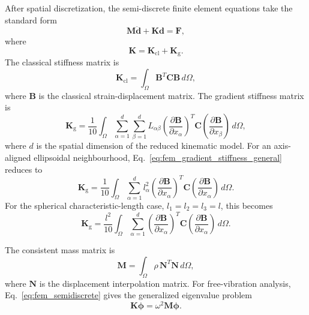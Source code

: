 \documentclass[final,3p,times,fleqn]{elsarticle}
\begin{document}
After spatial discretization, the semi-discrete finite element equations
take the standard form
\begin{equation}
\label{eq:fem_semidiscrete}
\mathbf{M}\ddot{\mathbf{d}}
+
\mathbf{K}\mathbf{d}
=
\mathbf{F},
\end{equation}
where
\begin{equation}
\label{eq:fem_total_stiffness}
\mathbf{K}
=
\mathbf{K}_{\mathrm{cl}}
+
\mathbf{K}_{\mathrm{g}} .
\end{equation}
The classical stiffness matrix is
\begin{equation}
\label{eq:fem_classical_stiffness}
\mathbf{K}_{\mathrm{cl}}
=
\int_{\Omega}\mathbf{B}^{T}\mathbf{C}\mathbf{B}\,d\Omega,
\end{equation}
where $\mathbf{B}$ is the classical strain-displacement matrix. The
gradient stiffness matrix is
\begin{equation}
\label{eq:fem_gradient_stiffness_general}
\mathbf{K}_{\mathrm{g}}
=
\frac{1}{10}
\int_{\Omega}
\sum_{\alpha=1}^{d}
\sum_{\beta=1}^{d}
L_{\alpha\beta}
\left(\frac{\partial\mathbf{B}}{\partial x_{\alpha}}\right)^{T}
\mathbf{C}
\left(\frac{\partial\mathbf{B}}{\partial x_{\beta}}\right)
\,d\Omega ,
\end{equation}
where $d$ is the spatial dimension of the reduced kinematic model.
For an axis-aligned ellipsoidal neighbourhood,
Eq.~\eqref{eq:fem_gradient_stiffness_general} reduces to
\begin{equation}
\label{eq:fem_gradient_stiffness_aligned}
\mathbf{K}_{\mathrm{g}}
=
\frac{1}{10}
\int_{\Omega}
\sum_{\alpha=1}^{d}
l_{\alpha}^{2}
\left(\frac{\partial\mathbf{B}}{\partial x_{\alpha}}\right)^{T}
\mathbf{C}
\left(\frac{\partial\mathbf{B}}{\partial x_{\alpha}}\right)
\,d\Omega .
\end{equation}
For the spherical characteristic-length case, $l_1=l_2=l_3=l$, this becomes
\begin{equation}
\label{eq:fem_gradient_stiffness_spherical}
\mathbf{K}_{\mathrm{g}}
=
\frac{l^2}{10}
\int_{\Omega}
\sum_{\alpha=1}^{d}
\left(\frac{\partial\mathbf{B}}{\partial x_{\alpha}}\right)^{T}
\mathbf{C}
\left(\frac{\partial\mathbf{B}}{\partial x_{\alpha}}\right)
\,d\Omega .
\end{equation}

The consistent mass matrix is
\begin{equation}
\label{eq:fem_mass_general}
\mathbf{M}
=
\int_{\Omega}
\rho\,\mathbf{N}^{T}\mathbf{N}\,d\Omega ,
\end{equation}
where $\mathbf{N}$ is the displacement interpolation matrix. For
free-vibration analysis, Eq.~\eqref{eq:fem_semidiscrete} gives the
generalized eigenvalue problem
\begin{equation}
\label{eq:fem_eigenproblem_general}
\mathbf{K}\boldsymbol{\phi}
=
\omega^2\mathbf{M}\boldsymbol{\phi}.
\end{equation}
\end{document}

